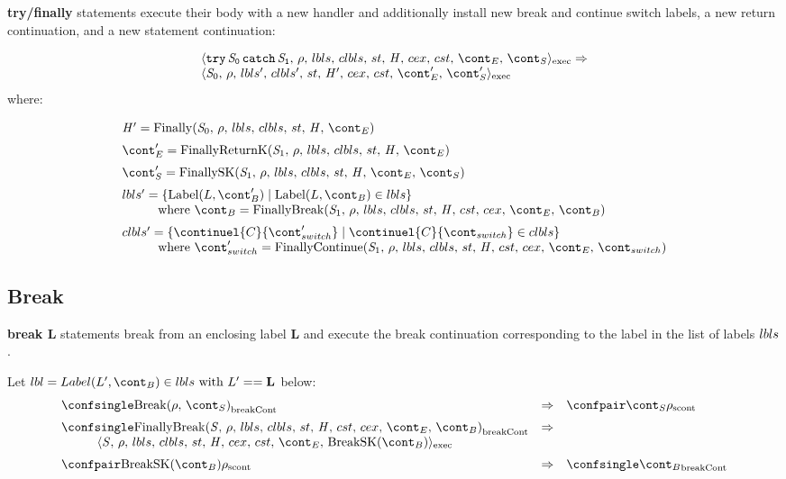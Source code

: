 \documentclass{article}
\begin{document}
\noindent
\textbf{try/finally} statements execute their body with a new handler and additionally install new break and continue switch labels, a new return continuation, and a new statement continuation:

\[
  \begin{array}{lcl}
	\execconf{\TryFinally{\stmti{0}}{\stmti{1}}}{\env}{\lbls}{\clbls}{\handler}{\cex}{\cstrace}{\econt}{\scont}
	\Rightarrow\\
	\execconf{\stmti{0}}{\env}{\lbls'}{\clbls'}{\handler'}{\cex}{\cstrace}{\econt'}{\scont'}
	  \end{array}
\]
where:

\[
  \begin{array}{lcl}
	\handler' = \FinallyK{\stmti{0}}\hspace{50mm}\\[2mm]

	\econt' = \FinallyReturnK{\stmti{1}}\\[2mm]

	\scont' = \FinallySK{\stmti{1}}\\[2mm]

	\lbls' = \lbrace \mathrm{Label}(L, \bcont') \mid \mathrm{Label}(L, \bcont) \in \lbls\rbrace \\
	\hspace{10mm}\textrm{where } \bcont = \FinallyBreak{\stmti{1}}{\bcont}\\[2mm]
	\clbls' =  \lbrace \continuel{C}{\switchcont'} \mid  \continuel{C}{\switchcont} \in \clbls\rbrace\\
	\hspace{10mm}\textrm{where } \switchcont' = \FinallyContinue{\stmti{1}}{\switchcont}

  \end{array}
\]
\subsection{Break}
\textbf{break L} statements break from an enclosing label \textbf{L} and execute the break continuation corresponding to the label in the list of labels $lbls$.

Let $\lbl = Label(L', \bcont) \in \lbls \textrm{ with } L' == \mathbf{L}$ below:
\[
  \begin{array}{lcl}
	\breakconf{\Break{\env}{\scont}}
	& \Rightarrow &
	\scontconf{\scont}{\env}\\[2mm]

	\breakconf{\FinallyBreak{\stmt}{\bcont}}
	& \Rightarrow \\
	\hspace{10mm}\execconf{\stmt}{\env}{\lbls}{\clbls}{\handler}{\cex}{\cstrace}{\econt}{\mathrm{BreakSK}(\bcont)}\\[2mm]

	\scontconf{\mathrm{BreakSK}(\bcont)}{\env}
	& \Rightarrow &
	\breakconf{\bcont}

  \end{array}
\]
\end{document}
